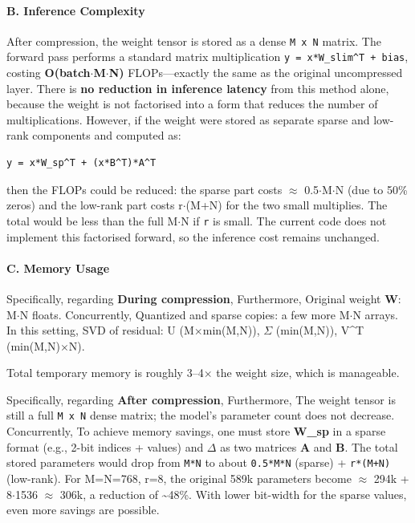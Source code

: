 \paragraph{B. Inference Complexity}

After compression, the weight tensor is stored as a dense \texttt{M x N} matrix. The forward pass performs a standard matrix multiplication \texttt{y = x*W\_slim\textasciicircum{}T + bias}, costing \textbf{O(batch$\cdot$M$\cdot$N)} FLOPs---exactly the same as the original uncompressed layer. There is \textbf{no reduction in inference latency} from this method alone, because the weight is not factorised into a form that reduces the number of multiplications. However, if the weight were stored as separate sparse and low-rank components and computed as:

\vspace{0.5em}
\begin{mdframed}[backgroundcolor=codebg, linecolor=codeframe, linewidth=1pt, roundcorner=4pt, innerleftmargin=2pt, innerrightmargin=5pt, innertopmargin=5pt, innerbottommargin=5pt]
\begin{lstlisting}
y = x*W_sp^T + (x*B^T)*A^T
\end{lstlisting}
\end{mdframed}
\vspace{0.5em}

then the FLOPs could be reduced: the sparse part costs $\approx$ 0.5$\cdot$M$\cdot$N (due to 50\% zeros) and the low-rank part costs r$\cdot$(M+N) for the two small multiplies. The total would be less than the full M$\cdot$N if \texttt{r} is small. The current code does not implement this factorised forward, so the inference cost remains unchanged.

\paragraph{C. Memory Usage}

Specifically, regarding \textbf{During compression},  Furthermore, Original weight \textbf{W}: M$\cdot$N floats. Concurrently, Quantized and sparse copies: a few more M$\cdot$N arrays. In this setting, SVD of residual: U (M$\times$min(M,N)), $\Sigma$ (min(M,N)), V\textasciicircum{}T (min(M,N)$\times$N).

Total temporary memory is roughly 3--4$\times$ the weight size, which is manageable.

Specifically, regarding \textbf{After compression},  Furthermore, The weight tensor is still a full \texttt{M x N} dense matrix; the model's parameter count does not decrease. Concurrently, To achieve memory savings, one must store \textbf{W\_sp} in a sparse format (e.g., 2-bit indices + values) and \textbf{$\Delta$} as two matrices \textbf{A} and \textbf{B}. The total stored parameters would drop from \texttt{M*N} to about \texttt{0.5*M*N} (sparse) + \texttt{r*(M+N)} (low-rank). For M=N=768, r=8, the original 589k parameters become $\approx$ 294k + 8$\cdot$1536 $\approx$ 306k, a reduction of \textasciitilde{}48\%. With lower bit-width for the sparse values, even more savings are possible.



